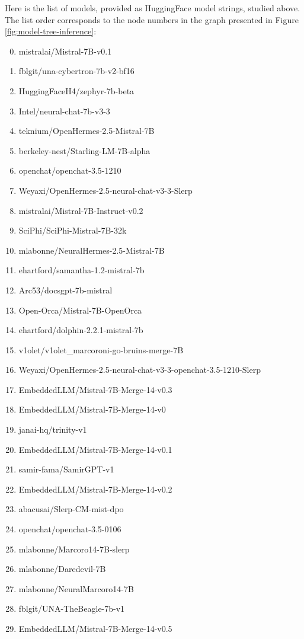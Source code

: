 \documentclass[11pt]{article}
\begin{document}
Here is the list of models, provided as HuggingFace model strings, studied above. The list order corresponds to the node numbers in the graph presented in Figure \ref{fig:model-tree-inference}:
\begin{enumerate}
\setcounter{enumi}{-1}
\item mistralai/Mistral-7B-v0.1
\item fblgit/una-cybertron-7b-v2-bf16
\item HuggingFaceH4/zephyr-7b-beta
\item Intel/neural-chat-7b-v3-3
\item teknium/OpenHermes-2.5-Mistral-7B
\item berkeley-nest/Starling-LM-7B-alpha
\item openchat/openchat-3.5-1210
\item Weyaxi/OpenHermes-2.5-neural-chat-v3-3-Slerp
\item mistralai/Mistral-7B-Instruct-v0.2
\item SciPhi/SciPhi-Mistral-7B-32k
\item mlabonne/NeuralHermes-2.5-Mistral-7B
\item ehartford/samantha-1.2-mistral-7b
\item Arc53/docsgpt-7b-mistral
\item Open-Orca/Mistral-7B-OpenOrca
\item ehartford/dolphin-2.2.1-mistral-7b
\item v1olet/v1olet\_marcoroni-go-bruins-merge-7B
\item Weyaxi/OpenHermes-2.5-neural-chat-v3-3-openchat-3.5-1210-Slerp
\item EmbeddedLLM/Mistral-7B-Merge-14-v0.3
\item EmbeddedLLM/Mistral-7B-Merge-14-v0
\item janai-hq/trinity-v1
\item EmbeddedLLM/Mistral-7B-Merge-14-v0.1
\item samir-fama/SamirGPT-v1
\item EmbeddedLLM/Mistral-7B-Merge-14-v0.2
\item abacusai/Slerp-CM-mist-dpo
\item openchat/openchat-3.5-0106
\item mlabonne/Marcoro14-7B-slerp
\item mlabonne/Daredevil-7B
\item mlabonne/NeuralMarcoro14-7B
\item fblgit/UNA-TheBeagle-7b-v1
\item EmbeddedLLM/Mistral-7B-Merge-14-v0.5

\end{enumerate}
\end{document}
